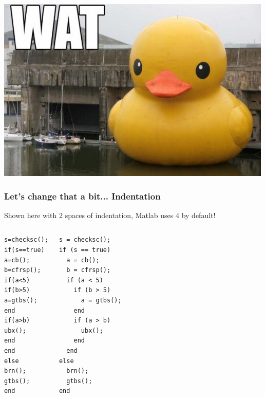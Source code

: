 \documentclass[11pt,table,final,fleqn,xcolor={usenames,dvipsnames},unknownkeysallowed,handout]{beamer}
\begin{document}
\begin{frame}[plain]
\includegraphics[keepaspectratio=true,width=\textwidth]{img/wat-2.jpg}
\end{frame}

\begin{frame}[fragile]
 \frametitle{Let's change that a bit... Indentation}
 \pause
 Shown here with 2 spaces of indentation, Matlab uses 4 by default!
 \begin{columns}[T]
     \begin{lstlisting}
s=checksc();
if(s==true)
a=cb();
b=cfrsp();
if(a<5)
if(b>5)
a=gtbs();
end
if(a>b)
ubx();
end
end
else
brn();
gtbs();
end
 \end{lstlisting}
     \begin{lstlisting}
s = checksc();
if (s == true)
  a = cb();
  b = cfrsp();
  if (a < 5)
    if (b > 5)
      a = gtbs();
    end
    if (a > b)
      ubx();
    end
  end
else
  brn();
  gtbs();
end
 \end{lstlisting}
 \end{columns}
\end{frame}
\end{document}
